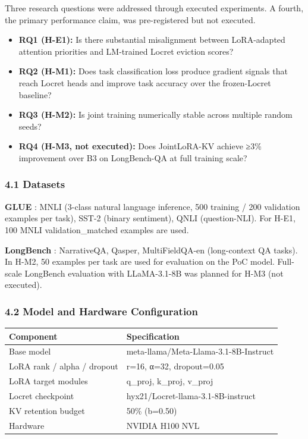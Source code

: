 
Three research questions were addressed through executed experiments. A fourth, the primary performance claim, was pre-registered but not executed.

\begin{itemize}
\item \textbf{RQ1 (H-E1):} Is there substantial misalignment between LoRA-adapted attention priorities and LM-trained Locret eviction scores?
\item \textbf{RQ2 (H-M1):} Does task classification loss produce gradient signals that reach Locret heads and improve task accuracy over the frozen-Locret baseline?
\item \textbf{RQ3 (H-M2):} Is joint training numerically stable across multiple random seeds?
\item \textbf{RQ4 (H-M3, not executed):} Does JointLoRA-KV achieve ≥3\% improvement over B3 on LongBench-QA at full training scale?
\end{itemize}

\subsubsection{4.1 Datasets}

\textbf{GLUE} \citep{Wangetal2018}: MNLI (3-class natural language inference, 500 training / 200 validation examples per task), SST-2 (binary sentiment), QNLI (question-NLI). For H-E1, 100 MNLI validation_matched examples are used.

\textbf{LongBench} \citep{Baietal2024}: NarrativeQA, Qasper, MultiFieldQA-en (long-context QA tasks). In H-M2, 50 examples per task are used for evaluation on the PoC model. Full-scale LongBench evaluation with LLaMA-3.1-8B was planned for H-M3 (not executed).

\subsubsection{4.2 Model and Hardware Configuration}

\begin{table}[htbp]
\centering
\begin{tabular}{ll}
\toprule
Component & Specification \\
\midrule
Base model & meta-llama/Meta-Llama-3.1-8B-Instruct \\
LoRA rank / alpha / dropout & r=16, α=32, dropout=0.05 \\
LoRA target modules & q_proj, k_proj, v_proj \\
Locret checkpoint & hyx21/Locret-llama-3.1-8B-instruct \\
KV retention budget & 50\% (b=0.50) \\
Hardware & NVIDIA H100 NVL \\
\bottomrule
\end{tabular}
\end{table}

